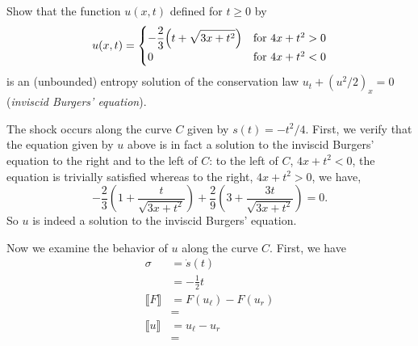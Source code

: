 \begin{problem}
  Show that the function \(u(x,t)\) defined for \(t\geq 0\) by
  \[
    u(x,t)=
    \begin{cases}
      \displaystyle-\frac{2}{3}\Bigl(t+\sqrt{3x+t^2}\Bigr)
      &\text{for \(4x+t^2>0\)}\\
      0
      &\text{for \(4x+t^2<0\)}
    \end{cases}
  \]
  is an (unbounded) entropy solution of the conservation law
  \(u_t+(u^2/2)_x=0\) (\emph{inviscid Burgers' equation}).
\end{problem}
\begin{solution}
  The shock occurs along the curve \(C\) given by \(s(t)=-t^2/4\). First,
  we verify that the equation given by \(u\) above is in fact a solution to
  the inviscid Burgers' equation to the right and to the left of \(C\): to
  the left of \(C\), \(4x+t^2<0\), the equation is trivially satisfied
  whereas to the right, \(4x+t^2>0\), we have,
  \[
    -\frac{2}{3}\left(1+\frac{t}{\sqrt{3x+t^2}}\right)
    +\frac{2}{9}\left(3+\frac{3t}{\sqrt{3x+t^2}}\right)
    =0.
  \]
  So \(u\) is indeed a solution to the inviscid Burgers' equation.

  Now we examine the behavior of \(u\) along the curve \(C\). First, we
  have
  \begin{align*}
    \sigma&=\dot s(t)\\
          &=-\frac{1}{2}t\\
    \llbracket F\rrbracket
          &=F(u_\ell)-F(u_r)\\
          &=\\
    \llbracket u\rrbracket
          &=u_\ell-u_r\\
          &=
  \end{align*}
\end{solution}


